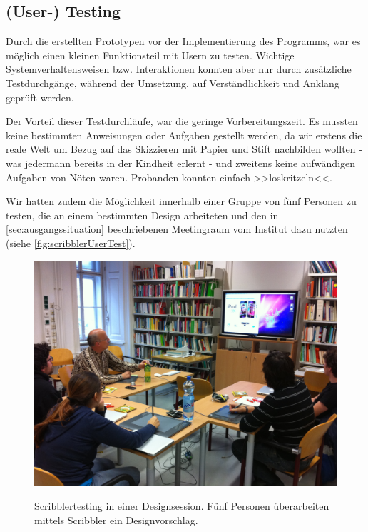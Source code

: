 \subsection{(User-) Testing}
Durch die erstellten Prototypen vor der Implementierung des Programms, war es möglich einen kleinen Funktionsteil mit Usern zu testen. Wichtige Systemverhaltensweisen bzw. Interaktionen konnten aber nur durch zusätzliche Testdurchgänge, während der Umsetzung, auf Verständlichkeit und Anklang geprüft werden.

\medskip Der Vorteil dieser Testdurchläufe, war die geringe Vorbereitungszeit. Es mussten keine bestimmten Anweisungen oder Aufgaben gestellt werden, da wir erstens die reale Welt um Bezug auf das Skizzieren mit Papier und Stift nachbilden wollten - was jedermann bereits in der Kindheit erlernt - und zweitens keine aufwändigen Aufgaben von Nöten waren. Probanden konnten einfach >>loskritzeln<<.

\medskip Wir hatten zudem die Möglichkeit \scribbler innerhalb einer Gruppe von fünf Personen zu testen, die an einem bestimmten Design arbeiteten und den in \autoref{sec:ausgangssituation} beschriebenen Meetingraum vom Institut dazu nutzten (siehe \autoref{fig:scribblerUserTest}).

\begin{figure}
	        {\includegraphics[width=1\linewidth]{gfx/scribblerUserTest}}
		\caption[Scribblertesting in einer Designsession]{Scribblertesting in einer Designsession. Fünf Personen überarbeiten mittels Scribbler ein Designvorschlag.}\label{fig:scribblerUserTest}
\end{figure}

